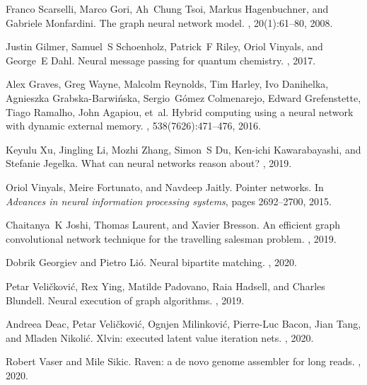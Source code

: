 \documentclass{article}
\begin{document}
\begin{thebibliography}{10}

Franco Scarselli, Marco Gori, Ah~Chung Tsoi, Markus Hagenbuchner, and Gabriele
  Monfardini.
\newblock The graph neural network model.
, 20(1):61--80, 2008.

Justin Gilmer, Samuel~S Schoenholz, Patrick~F Riley, Oriol Vinyals, and
  George~E Dahl.
\newblock Neural message passing for quantum chemistry.
, 2017.

Alex Graves, Greg Wayne, Malcolm Reynolds, Tim Harley, Ivo Danihelka, Agnieszka
  Grabska-Barwi{\'n}ska, Sergio~G{\'o}mez Colmenarejo, Edward Grefenstette,
  Tiago Ramalho, John Agapiou, et~al.
\newblock Hybrid computing using a neural network with dynamic external memory.
, 538(7626):471--476, 2016.

Keyulu Xu, Jingling Li, Mozhi Zhang, Simon~S Du, Ken-ichi Kawarabayashi, and
  Stefanie Jegelka.
\newblock What can neural networks reason about?
, 2019.

Oriol Vinyals, Meire Fortunato, and Navdeep Jaitly.
\newblock Pointer networks.
\newblock In {\em Advances in neural information processing systems}, pages
  2692--2700, 2015.

Chaitanya~K Joshi, Thomas Laurent, and Xavier Bresson.
\newblock An efficient graph convolutional network technique for the travelling
  salesman problem.
, 2019.

Dobrik Georgiev and Pietro Li{\'o}.
\newblock Neural bipartite matching.
, 2020.

Petar Veli{\v{c}}kovi{\'c}, Rex Ying, Matilde Padovano, Raia Hadsell, and
  Charles Blundell.
\newblock Neural execution of graph algorithms.
, 2019.

Andreea Deac, Petar Veli{\v{c}}kovi{\'c}, Ognjen Milinkovi{\'c}, Pierre-Luc
  Bacon, Jian Tang, and Mladen Nikoli{\'c}.
\newblock Xlvin: executed latent value iteration nets.
, 2020.

Robert Vaser and Mile Sikic.
\newblock Raven: a de novo genome assembler for long reads.
, 2020.


\end{thebibliography}
\end{document}
